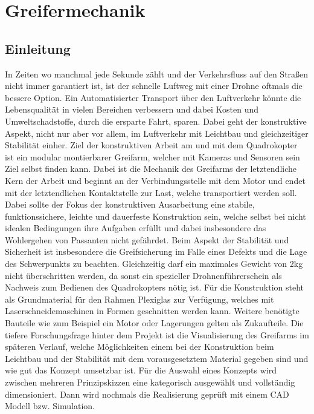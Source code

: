 \section{Greifermechanik}
\subsection{Einleitung}
In Zeiten wo manchmal jede Sekunde zählt und der Verkehrsfluss auf den Straßen
nicht immer garantiert ist, ist der schnelle Luftweg mit einer Drohne oftmals die bessere
Option. Ein Automatisierter Transport über den Luftverkehr könnte die Lebensqualität
in vielen Bereichen verbessern und dabei Kosten und Umweltschadstoffe, durch die
ersparte Fahrt, sparen. Dabei geht der konstruktive Aspekt, nicht nur aber vor allem,
im Luftverkehr mit Leichtbau und gleichzeitiger Stabilität einher.
Ziel der konstruktiven Arbeit am und mit dem Quadrokopter ist ein modular
montierbarer Greifarm, welcher mit Kameras und Sensoren sein Ziel selbst finden
kann. Dabei ist die Mechanik des Greifarms der letztendliche Kern der Arbeit und
beginnt an der Verbindungsstelle mit dem Motor und endet mit der letztendlichen
Kontaktstelle zur Last, welche transportiert werden soll.
Dabei sollte der Fokus der konstruktiven Ausarbeitung eine stabile, funktionssichere,
leichte und dauerfeste Konstruktion sein, welche selbst bei nicht idealen Bedingungen
ihre Aufgaben erfüllt und dabei insbesondere das Wohlergehen von Passanten nicht
gefährdet. Beim Aspekt der Stabilität und Sicherheit ist insbesondere die
Greifsicherung im Falle eines Defekts und die Lage des Schwerpunkts zu beachten.
Gleichzeitig darf ein maximales Gewicht von 2kg nicht überschritten werden, da sonst
ein spezieller Drohnenführerschein als Nachweis zum Bedienen des Quadrokopters
nötig ist.
Für die Konstruktion steht als Grundmaterial für den Rahmen Plexiglas zur Verfügung,
welches mit Laserschneidemaschinen in Formen geschnitten werden kann. Weitere
benötigte Bauteile wie zum Beispiel ein Motor oder Lagerungen gelten als Zukaufteile.
Die tiefere Forschungsfrage hinter dem Projekt ist die Visualisierung des Greifarms im
späteren Verlauf, welche Möglichkeiten einem bei der Konstruktion beim Leichtbau
und der Stabilität mit dem vorausgesetztem Material gegeben sind und wie gut das
Konzept umsetzbar ist.
Für die Auswahl eines Konzepts wird zwischen mehreren Prinzipskizzen eine
kategorisch ausgewählt und vollständig dimensioniert. Dann wird nochmals die
Realisierung geprüft mit einem CAD Modell bzw. Simulation. 